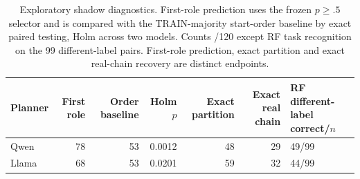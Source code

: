\begin{table}[t]\centering\footnotesize
\caption{Exploratory shadow diagnostics. First-role prediction uses the frozen $p\ge.5$ selector and is compared with the TRAIN-majority start-order baseline by exact paired testing, Holm across two models. Counts /120 except RF task recognition on the 99 different-label pairs. First-role prediction, exact partition and exact real-chain recovery are distinct endpoints.}\label{tab:supp-shadow-role}
\setlength{\tabcolsep}{3pt}
\begin{tabularx}{\textwidth}{@{}lrrrrrY@{}}\toprule
Planner & First role & Order baseline & Holm $p$ & Exact partition & Exact real chain & RF different-label correct/$n$ \\\midrule
Qwen & 78 & 53 & 0.0012 & 48 & 29 & 49/99 \\
Llama & 68 & 53 & 0.0201 & 59 & 32 & 44/99 \\
\bottomrule\end{tabularx}\end{table}
